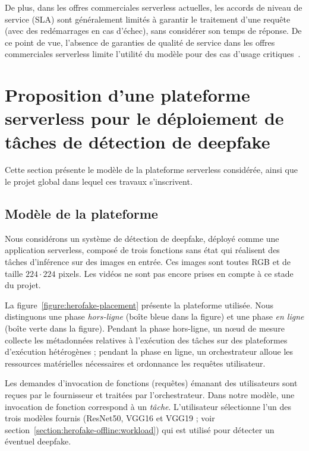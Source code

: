 De plus, dans les offres commerciales serverless actuelles, les accords de niveau de service (\gls{SLA}) sont généralement limités à garantir le traitement d'une requête (avec des redémarrages en cas d'échec), sans considérer son temps de réponse. De ce point de vue, l'absence de garanties de qualité de service dans les offres commerciales serverless limite l'utilité du modèle pour des cas d'usage critiques~\cite{buyyaSLAorientedResourceProvisioning2011}.

\section{Proposition d'une plateforme serverless pour le déploiement de tâches de détection de deepfake}
\label{section:herofake-deepfake}

Cette section présente le modèle de la plateforme serverless considérée, ainsi que le projet global dans lequel ces travaux s'inscrivent.

\subsection{Modèle de la plateforme}

Nous considérons un système de détection de deepfake, déployé comme une application serverless, composé de trois fonctions sans état qui réalisent des tâches d'inférence sur des images en entrée. Ces images sont toutes \gls{RGB} et de taille $224 \cdot 224$ pixels. Les vidéos ne sont pas encore prises en compte à ce stade du projet.

La figure~\ref{figure:herofake-placement} présente la plateforme utilisée. Nous distinguons une phase \textit{hors-ligne} (boîte bleue dans la figure) et une phase \textit{en ligne} (boîte verte dans la figure). Pendant la phase hors-ligne, un nœud de mesure collecte les métadonnées relatives à l'exécution des tâches sur des plateformes d'exécution hétérogènes ; pendant la phase en ligne, un orchestrateur alloue les ressources matérielles nécessaires et ordonnance les requêtes utilisateur.

Les demandes d'invocation de fonctions (requêtes) émanant des utilisateurs sont reçues par le fournisseur et traitées par l'orchestrateur. Dans notre modèle, une invocation de fonction correspond à un \textit{tâche}. L'utilisateur sélectionne l'un des trois modèles fournis (ResNet50, VGG16 et VGG19 ; voir section~\ref{section:herofake-offline:workload}) qui est utilisé pour détecter un éventuel deepfake.

